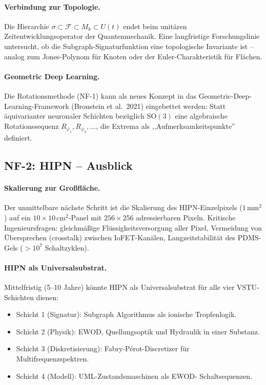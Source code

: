 ﻿\documentclass[a4paper,12pt]{scrreprt}
\theoremstyle{definition}
\begin{document}
\paragraph{Verbindung zur Topologie.}
Die Hierarchie $\sigma \subset \mathcal{F} \subset M_k \subset U(t)$
endet beim unitären Zeitentwicklungsoperator der Quantenmechanik.
Eine langfristige Forschungslinie untersucht, ob die
Subgraph-Signaturfunktion eine topologische Invariante ist -- analog
zum Jones-Polynom für Knoten oder der Euler-Charakteristik für Flächen.

\paragraph{Geometric Deep Learning.}
Die Rotationsmethode (NF-1) kann als neues Konzept in das
Geometric-Deep-Learning-Framework (Bronstein et al.\ 2021)
eingebettet werden: Statt äqui\-varianter neuronaler Schichten
bezüglich $\mathrm{SO}(3)$ eine algebraische Rotationssequenz
$R_{\varphi_1}, R_{\varphi_2}, \ldots$, die Extrema als
,,Aufmerksamkeitspunkte'' definiert.

\subsection*{NF-2: HIPN -- Ausblick}

\paragraph{Skalierung zur Großfläche.}
Der unmittelbare nächste Schritt ist die Skalierung des HIPN-Einzelpixels
($1$\,mm$^2$) auf ein $10\times 10$\,cm$^2$-Panel mit
$256 \times 256$ adressierbaren Pixeln. Kritische
Ingenieursfragen: gleichmäßige Flüssigkeitsversorgung aller Pixel,
Vermeidung von Übersprechen (crosstalk) zwischen IoFET-Kanälen,
Langzeitstabilität des PDMS-Gels ($> 10^7$ Schaltzyklen).

\paragraph{HIPN als Universalsubstrat.}
Mittelfristig (5--10 Jahre) könnte HIPN als Universalsubstrat für alle
vier VSTU-Schichten dienen:
\begin{itemize}
  \item Schicht 1 (Signatur): Subgraph Algorithmus als ionische
    Tropfenlogik.
  \item Schicht 2 (Physik): EWOD, Quellungsoptik und Hydraulik in
    einer Substanz.
  \item Schicht 3 (Diskretisierung): Fabry-Pérot-Discretizer
    für Multifrequenzspektren.
  \item Schicht 4 (Modell): UML-Zustandsmaschinen als EWOD-
    Schaltsequenzen.
\end{itemize}
\end{document}
